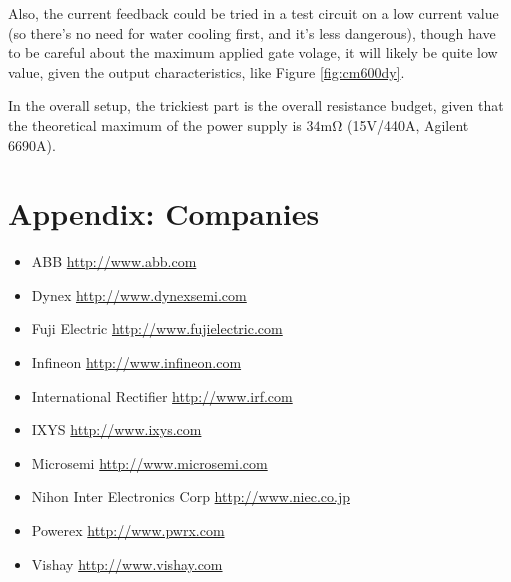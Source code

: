 \documentclass[12pt,a4paper]{article}
\begin{document}
Also, the current feedback could be tried in a test circuit on a low current value (so there's no need for water cooling first, and it's less dangerous), though have to be careful about the maximum applied gate volage, it will likely be quite low value, given the output characteristics, like Figure \ref{fig:cm600dy}.

In the overall setup, the trickiest part is the overall resistance budget, given that the theoretical maximum of the power supply is $34 \mathrm{m\Omega}$ (15V/440A, Agilent 6690A).

\section{Appendix: Companies}

\begin{itemize} \itemsep -2pt
\item ABB \url{http://www.abb.com}
\item Dynex \url{http://www.dynexsemi.com}
\item Fuji Electric \url{http://www.fujielectric.com}
\item Infineon \url{http://www.infineon.com}
\item International Rectifier \url{http://www.irf.com}
\item IXYS \url{http://www.ixys.com}
\item Microsemi \url{http://www.microsemi.com}
\item Nihon Inter Electronics Corp \url{http://www.niec.co.jp}
\item Powerex \url{http://www.pwrx.com}
\item Vishay \url{http://www.vishay.com}
\end{itemize}



\end{document}
